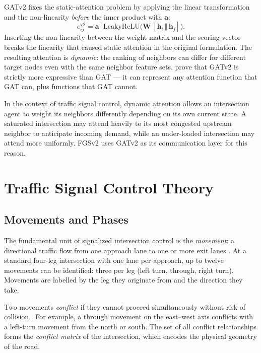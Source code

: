 GATv2 \citep{brody2022how} fixes the static-attention problem by applying the linear transformation and the non-linearity \emph{before} the inner product with $\mathbf{a}$:
\begin{equation}
  e_{ij}^{\mathrm{v2}} = \mathbf{a}^\top \mathrm{LeakyReLU}\!\bigl(\mathbf{W}\,[\mathbf{h}_i \,\Vert\, \mathbf{h}_j]\bigr).
  \label{eq:gatv2_attention}
\end{equation}
Inserting the non-linearity between the weight matrix and the scoring vector breaks the linearity that caused static attention in the original formulation. The resulting attention is \emph{dynamic}: the ranking of neighbors can differ for different target nodes even with the same neighbor feature sets. \citeauthor{brody2022how} prove that GATv2 is strictly more expressive than GAT — it can represent any attention function that GAT can, plus functions that GAT cannot.

In the context of traffic signal control, dynamic attention allows an intersection agent to weight its neighbors differently depending on its own current state. A saturated intersection may attend heavily to its most congested upstream neighbor to anticipate incoming demand, while an under-loaded intersection may attend more uniformly. FGSv2 uses GATv2 as its communication layer for this reason.

\section{Traffic Signal Control Theory}
\label{sec:TheoreticalBackground_TrafficControlTheory}

\subsection{Movements and Phases}
\label{sec:TheoreticalBackground_Movements}

The fundamental unit of signalized intersection control is the \emph{movement}: a directional traffic flow from one approach lane to one or more exit lanes \citep{koonce2008signal}. At a standard four-leg intersection with one lane per approach, up to twelve movements can be identified: three per leg (left turn, through, right turn). Movements are labelled by the leg they originate from and the direction they take.

Two movements \emph{conflict} if they cannot proceed simultaneously without risk of collision \citep{koonce2008signal}. For example, a through movement on the east--west axis conflicts with a left-turn movement from the north or south. The set of all conflict relationships forms the \emph{conflict matrix} of the intersection, which encodes the physical geometry of the road.

